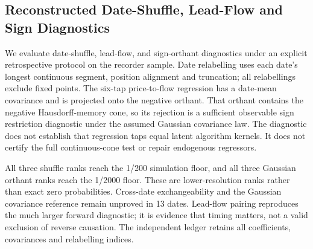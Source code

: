 \documentclass[12pt]{article}
\theoremstyle{definition}
\theoremstyle{remark}
\begin{document}
\subsection{Reconstructed Date-Shuffle, Lead-Flow and Sign Diagnostics}
We evaluate date-shuffle, lead-flow, and sign-orthant diagnostics under an explicit retrospective protocol on the recorder sample. Date relabelling uses each date's longest continuous segment, position alignment and truncation; all relabellings exclude fixed points. The six-tap price-to-flow regression has a date-mean covariance and is projected onto the negative orthant. That orthant contains the negative Hausdorff-memory cone, so its rejection is a sufficient observable sign restriction diagnostic under the assumed Gaussian covariance law. The diagnostic does not establish that regression taps equal latent algorithm kernels. It does not certify the full continuous-cone test or repair endogenous regressors.
\begin{table}[htbp]
\centering\footnotesize\setlength{\tabcolsep}{3pt}
\caption{Reconstructed recorder diagnostics: 199 fixed-point-free whole-date flow relabellings and 1,999 Gaussian vertex draws for the six-tap negative orthant. The printed ranks are simulation diagnostics at finite resolution, not randomized-treatment or finite-sample market $p$ values.}
\label{tab:falsification}
\end{table}

All three shuffle ranks reach the 1/200 simulation floor, and all three Gaussian orthant ranks reach the 1/2000 floor. These are lower-resolution ranks rather than exact zero probabilities. Cross-date exchangeability and the Gaussian covariance reference remain unproved in 13 dates. Lead-flow pairing reproduces the much larger forward diagnostic; it is evidence that timing matters, not a valid exclusion of reverse causation. The independent ledger retains all coefficients, covariances and relabelling indices.
\end{document}
